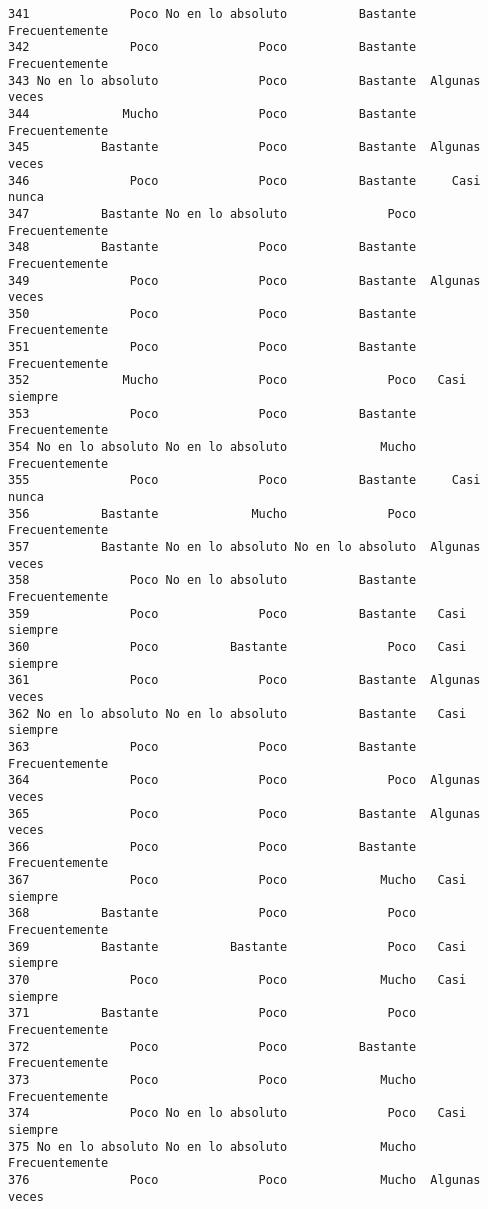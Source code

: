 \documentclass[
  letterpaper,
  DIV=11,
  numbers=noendperiod]{scrartcl}
\begin{document}
\begin{verbatim}
341              Poco No en lo absoluto          Bastante Frecuentemente
342              Poco              Poco          Bastante Frecuentemente
343 No en lo absoluto              Poco          Bastante  Algunas veces
344             Mucho              Poco          Bastante Frecuentemente
345          Bastante              Poco          Bastante  Algunas veces
346              Poco              Poco          Bastante     Casi nunca
347          Bastante No en lo absoluto              Poco Frecuentemente
348          Bastante              Poco          Bastante Frecuentemente
349              Poco              Poco          Bastante  Algunas veces
350              Poco              Poco          Bastante Frecuentemente
351              Poco              Poco          Bastante Frecuentemente
352             Mucho              Poco              Poco   Casi siempre
353              Poco              Poco          Bastante Frecuentemente
354 No en lo absoluto No en lo absoluto             Mucho Frecuentemente
355              Poco              Poco          Bastante     Casi nunca
356          Bastante             Mucho              Poco Frecuentemente
357          Bastante No en lo absoluto No en lo absoluto  Algunas veces
358              Poco No en lo absoluto          Bastante Frecuentemente
359              Poco              Poco          Bastante   Casi siempre
360              Poco          Bastante              Poco   Casi siempre
361              Poco              Poco          Bastante  Algunas veces
362 No en lo absoluto No en lo absoluto          Bastante   Casi siempre
363              Poco              Poco          Bastante Frecuentemente
364              Poco              Poco              Poco  Algunas veces
365              Poco              Poco          Bastante  Algunas veces
366              Poco              Poco          Bastante Frecuentemente
367              Poco              Poco             Mucho   Casi siempre
368          Bastante              Poco              Poco Frecuentemente
369          Bastante          Bastante              Poco   Casi siempre
370              Poco              Poco             Mucho   Casi siempre
371          Bastante              Poco              Poco Frecuentemente
372              Poco              Poco          Bastante Frecuentemente
373              Poco              Poco             Mucho Frecuentemente
374              Poco No en lo absoluto              Poco   Casi siempre
375 No en lo absoluto No en lo absoluto             Mucho Frecuentemente
376              Poco              Poco             Mucho  Algunas veces

\end{verbatim}
\end{document}
